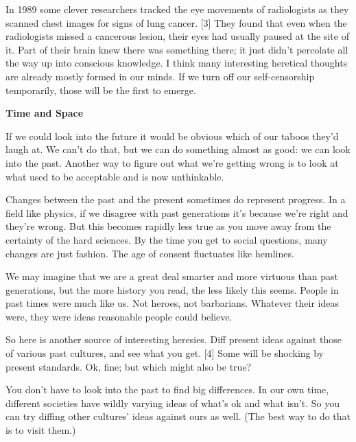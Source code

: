 In 1989 some clever
                  researchers tracked the eye movements of radiologists as they
                  scanned chest images for signs of lung cancer. [3] They found
                  that even when the radiologists missed a cancerous lesion,
                  their eyes had usually paused at the site of it. Part of their
                  brain knew there was something there; it just didn't percolate
                  all the way up into conscious knowledge. I think many
                  interesting heretical thoughts are already mostly formed in
                  our minds. If we turn off our self-censorship temporarily,
                  those will be the first to emerge.

\textbf{Time and Space}

If we could look into the future it would be
                  obvious which of our taboos they'd laugh at. We can't do that,
                  but we can do something almost as good: we can look into the
                  past. Another way to figure out what we're getting wrong is to
                  look at what used to be acceptable and is now unthinkable.

Changes
                  between the past and the present sometimes do represent
                  progress. In a field like physics, if we disagree with past
                  generations it's because we're right and they're wrong. But
                  this becomes rapidly less true as you move away from the
                  certainty of the hard sciences. By the time you get to social
                  questions, many changes are just fashion. The age of consent
                  fluctuates like hemlines.

We may imagine that we
                  are a great deal smarter and more virtuous than past
                  generations, but the more history you read, the less likely
                  this seems. People in past times were much like us. Not
                  heroes, not barbarians. Whatever their ideas were, they were
                  ideas reasonable people could believe.

So here is
                  another source of interesting heresies. Diff present ideas
                  against those of various past cultures, and see what you get.
                  [4] Some will be shocking by present standards. Ok, fine; but
                  which might also be true?

You don't have to look
                  into the past to find big differences. In our own time,
                  different societies have wildly varying ideas of what's ok and
                  what isn't. So you can try diffing other cultures' ideas
                  against ours as well. (The best way to do that is to visit
                  them.)
                  
